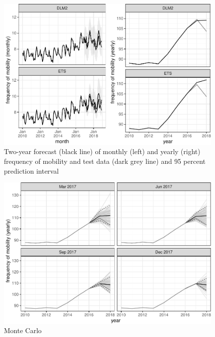 \documentclass[]{article}
\begin{document}
\begin{figure}
\centering
\includegraphics{../figs/freq--forecast-2017-1.pdf}
\caption{\label{fig:forecast-2017}Two-year forecast (black line) of monthly
(left) and yearly (right) frequency of mobility and test data (dark grey
line) and 95 percent prediction interval}
\end{figure}

\begin{figure}
\centering
\includegraphics{../figs/freq--mc-intervals-1.pdf}
\caption{\label{fig:mc-intervals}Monte Carlo}
\end{figure}
\end{document}
